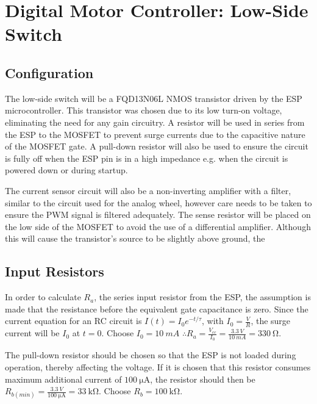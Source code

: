 \graphicspath{{content/2_design/figures/}}
\section{Digital Motor Controller: Low-Side Switch}

\subsection{Configuration}

The low-side switch will be a FQD13N06L NMOS transistor driven by the ESP microcontroller. This transistor was chosen due to its
low turn-on voltage, eliminating the need for any gain circuitry. A resistor will be used in series from the ESP to the MOSFET to
prevent surge currents due to the capacitive nature of the MOSFET gate. A pull-down resistor will also be used to ensure
the circuit is fully off when the ESP pin is in a high impedance e.g. when the circuit is powered down or during startup.

The current sensor circuit will also be a non-inverting amplifier with a filter, similar to the circuit used for the analog wheel,
however care needs to be taken to ensure the PWM signal is filtered adequately. The sense resistor will be placed on the low side
of the MOSFET to avoid the use of a differential amplifier. Although this will cause the transistor's source to be slightly
above ground, the 

\subsection{Input Resistors}

In order to calculate $R_a$, the series input resistor from the ESP, the assumption is made that the resistance before the equivalent gate capacitance is zero.
Since the current equation for an RC circuit is $I(t) = I_0 e^{-t/\tau}$, with $I_0 = \frac{V}{R}$, the surge current will be $I_0$ at $t = 0$. Choose $I_0 = \SI{10}{mA}$
$\therefore R_a = \frac{V_{cc}}{I_0} = \frac{\SI{3.3}{V}}{\SI{10}{mA}} = \SI{330}{\ohm}$.

The pull-down resistor should be chosen so that the ESP is not loaded during operation, thereby affecting the voltage. If it is chosen that this resistor consumes
maximum additional current of $\SI{100}{\micro\ampere}$, the resistor should then be $R_{b(min)} = \frac{\SI{3.3}{V}}{\SI{100}{\micro\ampere}} = \SI{33}{\kilo\ohm}$.
Choose $R_b = \SI{100}{\kilo\ohm}$.

